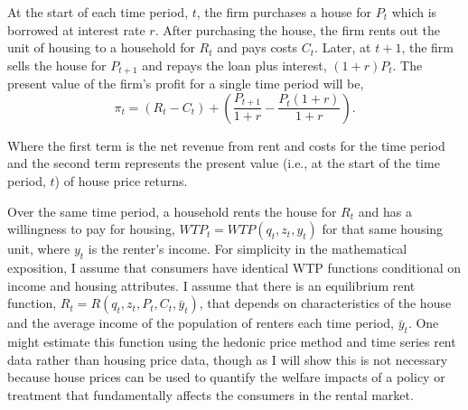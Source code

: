 \documentclass[ecta,nameyear,draft]{econsocart}
\theoremstyle{plain}
\theoremstyle{remark}
\begin{document}
At the start of each time period, $t$, the firm purchases a house for $P_t$ which is borrowed at interest rate $r$. After purchasing the house, the firm rents out the unit of housing to a household for $R_t$ and pays costs $C_t$. Later, at $t+1$, the firm sells the house for $P_{t+1}$ and repays the loan plus interest, $(1 + r)P_t$.  The present value of the firm’s profit for a single time period will be,
\begin{equation}
\pi_t = (R_t-C_t)+\left(\frac{P_{t+1}}{1+r}-\frac{P_t(1+r)}{1+r}\right).\label{pi1}
\end{equation}

Where the first term is the net revenue from rent and costs for the time period and the second term
represents the present value (i.e., at the start of the time period, $t$) of house price returns.

Over the same time period, a household rents the house for $R_t$ and has a willingness to pay for housing, $\mathit{WTP}_t=\mathit{WTP}(q_t,z_t,y_t)$ for that same housing unit, where $y_t$ is the renter's income. For simplicity in the mathematical exposition, I assume that consumers have identical WTP functions conditional on income and housing attributes. I assume that there is an equilibrium rent function, $R_t=R(q_t,z_t,P_t,C_t,\bar{y}_t)$, that depends on characteristics of the house and the average income of the population of renters each time period, $\bar{y}_t$. One might estimate this function using the hedonic price method and time series rent data rather than housing price data, though as I will show this is not necessary because house prices can be used to quantify the welfare impacts of a policy or treatment that fundamentally affects the consumers in the rental market. 
\end{document}

